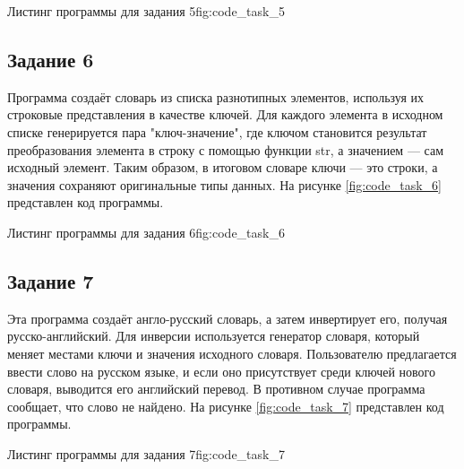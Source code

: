 \documentclass[]{vvsu}
\begin{document}
\begin{vvsu_figure}{Листинг программы для задания 5}{fig:code_task_5}
  \begin{minipage}{.75\textwidth}
    
  \end{minipage}
\end{vvsu_figure}

\subsection{Задание 6}

Программа создаёт словарь из списка разнотипных элементов, используя их строковые представления в качестве ключей. Для каждого элемента в исходном списке генерируется пара "ключ-значение", где ключом становится результат преобразования элемента в строку с помощью функции str, а значением — сам исходный элемент. Таким образом, в итоговом словаре ключи — это строки, а значения сохраняют оригинальные типы данных. На рисунке \ref{fig:code_task_6} представлен код программы.

\begin{vvsu_figure}{Листинг программы для задания 6}{fig:code_task_6}
  \begin{minipage}{.75\textwidth}
    
  \end{minipage}
\end{vvsu_figure}

\subsection{Задание 7}

Эта программа создаёт англо-русский словарь, а затем инвертирует его, получая русско-английский. Для инверсии используется генератор словаря, который меняет местами ключи и значения исходного словаря. Пользователю предлагается ввести слово на русском языке, и если оно присутствует среди ключей нового словаря, выводится его английский перевод. В противном случае программа сообщает, что слово не найдено. На рисунке \ref{fig:code_task_7} представлен код программы.

\begin{vvsu_figure}{Листинг программы для задания 7}{fig:code_task_7}
  \begin{minipage}{.75\textwidth}
    
  \end{minipage}
\end{vvsu_figure}
\end{document}

